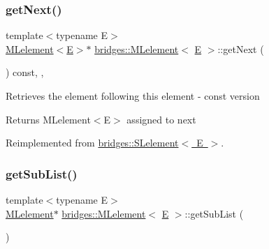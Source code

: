\subsubsection{\texorpdfstring{getNext()}{getNext()}\hspace{0.1cm}{\footnotesize\ttfamily [2/2]}}
{\footnotesize\ttfamily template$<$typename E$>$ \\
\mbox{\hyperlink{classbridges_1_1_m_lelement}{M\+Lelement}}$<$\mbox{\hyperlink{namespacebridges_acfb0a4f7877d8f63de3e6862004c50eda3a3ea00cfc35332cedf6e5e9a32e94da}{E}}$>$$\ast$ \mbox{\hyperlink{classbridges_1_1_m_lelement}{bridges\+::\+M\+Lelement}}$<$ \mbox{\hyperlink{namespacebridges_acfb0a4f7877d8f63de3e6862004c50eda3a3ea00cfc35332cedf6e5e9a32e94da}{E}} $>$\+::get\+Next (\begin{DoxyParamCaption}{ }\end{DoxyParamCaption}) const\hspace{0.3cm}{\ttfamily [inline]}, {\ttfamily [override]}, {\ttfamily [virtual]}}

Retrieves the element following this element -\/ const version

\begin{DoxyReturn}{Returns}
M\+Lelement$<$\+E$>$ assigned to next 
\end{DoxyReturn}


Reimplemented from \mbox{\hyperlink{classbridges_1_1_s_lelement_a4422b7731a84734d312b8cd8e241b1e8}{bridges\+::\+S\+Lelement$<$ E $>$}}.

\mbox{\label{classbridges_1_1_m_lelement_a55f82b59284e22caef23959e023614cc}} 
\subsubsection{\texorpdfstring{getSubList()}{getSubList()}}
{\footnotesize\ttfamily template$<$typename E$>$ \\
\mbox{\hyperlink{classbridges_1_1_m_lelement}{M\+Lelement}}$\ast$ \mbox{\hyperlink{classbridges_1_1_m_lelement}{bridges\+::\+M\+Lelement}}$<$ \mbox{\hyperlink{namespacebridges_acfb0a4f7877d8f63de3e6862004c50eda3a3ea00cfc35332cedf6e5e9a32e94da}{E}} $>$\+::get\+Sub\+List (\begin{DoxyParamCaption}{ }\end{DoxyParamCaption})\hspace{0.3cm}{\ttfamily [inline]}}

